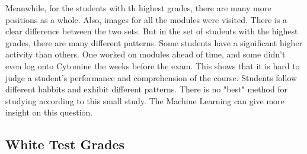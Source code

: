 \documentclass[a4paper,11pt]{report}
\numberwithin{figure}{chapter} %
\begin{document}
    Meanwhile, for the students with th highest grades, there are many more positions as a whole.
    Also, images for all the modules were visited.
    There is a clear difference between the two sets.
    But in the set of students with the highest grades, there are many different patterns.
    Some students have a significant higher activity than others.
    One worked on modules ahead of time, and some didn't even log onto Cytomine the weeks before the exam.
    This shows that it is hard to judge a student's performance and comprehension of the course.
    Students follow different habbits and exhibit different patterns.
    There is no "best" method for studying according to this small study.
    The Machine Learning can give more insight on this question.



    \subsection{White Test Grades}
\end{document}

